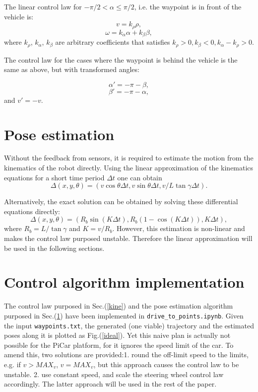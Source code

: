 \documentclass[12pt]{article}
\begin{document}
The linear control law for $-\pi/2<\alpha\le \pi/2$, i.e. the waypoint is in front of the vehicle is:
$$v=k_\rho \rho,$$
$$\omega=k_\alpha \alpha+k_\beta \beta,$$
where $k_\rho$, $k_\alpha$, $k_\beta$ are arbitrary coefficients that satisfies $k_\rho>0, k_\beta<0,k_\alpha-k_\rho>0.$

The control law for the cases where the waypoint is behind the vehicle is the same as above, but with transformed angles:

$$\alpha'=-\pi-\beta,$$
$$\beta'=-\pi-\alpha,$$
and $v'=-v$.

\section{Pose estimation}
\label{pose}
Without the feedback from sensors, it is required to estimate the motion from the kinematics of the robot directly. Using the linear approximation of the kinematics equations for a short time period $\Delta t$ one can obtain
$$\Delta(x,y,\theta)=(v\cos \theta \Delta t ,v \sin \theta \Delta t, v/L \tan \gamma \Delta t).$$

Alternatively, the exact solution can be obtained by solving these differential equations directly:
$$\Delta(x,y,\theta)=(R_b\sin(K\Delta t),R_b(1-\cos(K\Delta t)),K\Delta t),$$
where $R_b=L/\tan \gamma$ and $K=v/R_b$. However, this estimation is non-linear and makes the control law purposed unstable. Therefore the linear approximation will be used in the following sections.


\section{Control algorithm implementation}
The control law purposed in Sec.(\ref{kine}) and the pose estimation algorithm purposed in Sec.(\ref{pose}) have been implemented in \texttt{drive\_to\_points.ipynb}.  Given the input \texttt{waypoints.txt}, the generated (one viable) trajectory and the estimated poses along it is plotted as Fig.(\ref{ideal}). Yet this naive plan is actually not possible for the PiCar platform, for it ignores the speed limit of the car. To amend this, two solutions are provided:1. round the off-limit speed to the limits, e.g. if $v>MAX_v$, $v=MAX_v$, but this approach causes the control law to be unstable. 2. use constant speed, and scale the steering wheel control law accordingly. The latter approach will be used in the rest of the paper.
\end{document}
